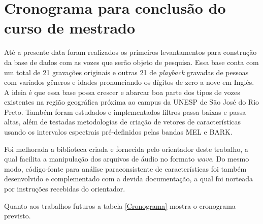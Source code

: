 \documentclass[a4paper,12pt,openright,oneside]{book}
\newenvironment{myenv}[1]
  {\begin{spacing}{#1}}
  {\end{spacing}}
\begin{document}
	\chapter{Cronograma para conclusão do curso de mestrado}
		\begin{myenv}{1.5}
			\par Até a presente data foram realizados os primeiros levantamentos para construção da base de dados com as vozes que serão objeto de pesquisa. Essa base conta com um total de 21 gravações originais e outras 21 de \textit{playback} gravadas de pessoas com variados gêneros e idades pronunciando os dígitos de zero a nove em Inglês. A ideia é que essa base possa crescer e abarcar boa parte dos tipos de vozes existentes na região geográfica próxima ao campus da UNESP de São José do Rio Preto. Também foram estudados e implementados filtros passa baixas e passa altas, além de testadas metodologias de criação de vetores de características usando os intervalos espectrais pré-definidos pelas bandas MEL e BARK. 
			\par Foi melhorada a biblioteca criada e fornecida pelo orientador deste trabalho, a qual facilita a manipulação dos arquivos de áudio no formato \textit{wave}. Do mesmo modo, código-fonte para análise paraconsistente de características foi também desenvolvido e complementado com a devida documentação, a qual foi norteada por instruções recebidas do orientador.
			\par Quanto aos trabalhos futuros a tabela \ref{Cronograma} mostra o cronograma previsto.
			
			\newcommand\ytl[2]{
				\parbox[b]{10em}{
					\hfill{\color{black}\bfseries\sffamily #1}~$\cdots\cdots$~
				}
				\makebox[0pt][c]{
					$\bullet$
				}\vrule\quad \parbox[c]{4.5cm}{
				\vspace{7pt}\color{black}\raggedright\sffamily #2.\\[7pt]
				}\\
				[-3pt]
			}
		

\end{myenv}
\end{document}
